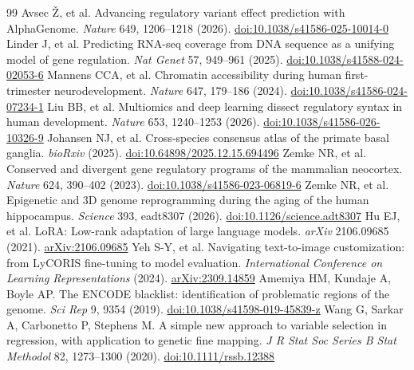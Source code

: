 \documentclass[11pt]{article}
\begin{document}
\begin{thebibliography}{99}
 Avsec \v{Z}, et al. Advancing regulatory variant effect prediction with AlphaGenome. \emph{Nature} 649, 1206--1218 (2026). \href{https://doi.org/10.1038/s41586-025-10014-0}{doi:10.1038/s41586-025-10014-0}
 Linder J, et al. Predicting RNA-seq coverage from DNA sequence as a unifying model of gene regulation. \emph{Nat Genet} 57, 949--961 (2025). \href{https://doi.org/10.1038/s41588-024-02053-6}{doi:10.1038/s41588-024-02053-6}
 Mannens CCA, et al. Chromatin accessibility during human first-trimester neurodevelopment. \emph{Nature} 647, 179--186 (2024). \href{https://doi.org/10.1038/s41586-024-07234-1}{doi:10.1038/s41586-024-07234-1}
 Liu BB, et al. Multiomics and deep learning dissect regulatory syntax in human development. \emph{Nature} 653, 1240--1253 (2026). \href{https://doi.org/10.1038/s41586-026-10326-9}{doi:10.1038/s41586-026-10326-9}
 Johansen NJ, et al. Cross-species consensus atlas of the primate basal ganglia. \emph{bioRxiv} (2025). \href{https://doi.org/10.64898/2025.12.15.694496}{doi:10.64898/2025.12.15.694496}
 Zemke NR, et al. Conserved and divergent gene regulatory programs of the mammalian neocortex. \emph{Nature} 624, 390--402 (2023). \href{https://doi.org/10.1038/s41586-023-06819-6}{doi:10.1038/s41586-023-06819-6}
 Zemke NR, et al. Epigenetic and 3D genome reprogramming during the aging of the human hippocampus. \emph{Science} 393, eadt8307 (2026). \href{https://doi.org/10.1126/science.adt8307}{doi:10.1126/science.adt8307}
 Hu EJ, et al. LoRA: Low-rank adaptation of large language models. \emph{arXiv} 2106.09685 (2021). \href{https://arxiv.org/abs/2106.09685}{arXiv:2106.09685}
 Yeh S-Y, et al. Navigating text-to-image customization: from LyCORIS fine-tuning to model evaluation. \emph{International Conference on Learning Representations} (2024). \href{https://arxiv.org/abs/2309.14859}{arXiv:2309.14859}
 Amemiya HM, Kundaje A, Boyle AP. The ENCODE blacklist: identification of problematic regions of the genome. \emph{Sci Rep} 9, 9354 (2019). \href{https://doi.org/10.1038/s41598-019-45839-z}{doi:10.1038/s41598-019-45839-z}
 Wang G, Sarkar A, Carbonetto P, Stephens M. A simple new approach to variable selection in regression, with application to genetic fine mapping. \emph{J R Stat Soc Series B Stat Methodol} 82, 1273--1300 (2020). \href{https://doi.org/10.1111/rssb.12388}{doi:10.1111/rssb.12388}

\end{thebibliography}
\end{document}
